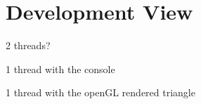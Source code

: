\section{Development View}

2 threads?

1 thread with the console

1 thread with the openGL rendered triangle

